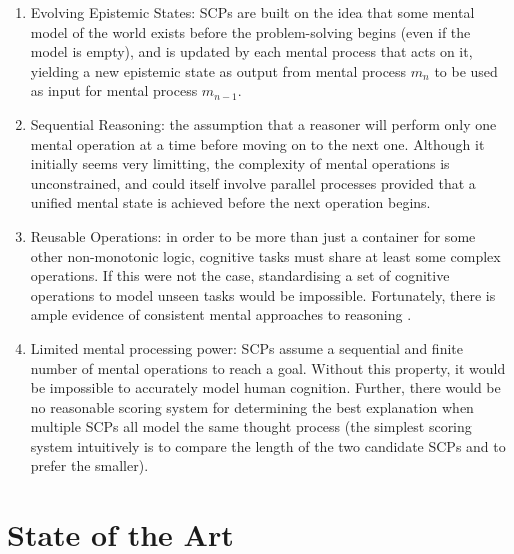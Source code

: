 \documentclass{article}
\begin{document}
\begin{enumerate}
\item Evolving Epistemic States: SCPs are built on the idea that some mental model of the world exists before the problem-solving begins (even if the model is empty), and is updated by each mental process that acts on it, yielding a new epistemic state as output from mental process $m_n$ to be used as input for mental process $m_{n-1}$.
\item Sequential Reasoning: the assumption that a reasoner will perform only one mental operation at a time before moving on to the next one. Although it initially seems very limitting, the complexity of mental operations is unconstrained, and could itself involve parallel processes provided that a unified mental state is achieved before the next operation begins.
\item Reusable Operations: in order to be more than just a container for some other non-monotonic logic, cognitive tasks must share at least some complex operations. If this were not the case, standardising a set of cognitive operations to model unseen tasks would be impossible. Fortunately, there is ample evidence of consistent mental approaches to reasoning \citep{ragni2017formal}.
\item Limited mental processing power: SCPs assume a sequential and finite number of mental operations to reach a goal. Without this property, it would be impossible to accurately model human cognition. Further, there would be no reasonable scoring system for determining the best explanation when multiple SCPs all model the same thought process (the simplest scoring system intuitively is to compare the length of the two candidate SCPs and to prefer the smaller).
\end{enumerate}



\section{State of the Art}
\end{document}
